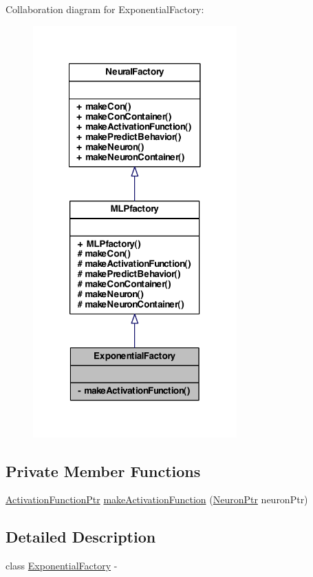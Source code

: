 Collaboration diagram for ExponentialFactory:
\nopagebreak
\begin{figure}[H]
\begin{center}
\leavevmode
\includegraphics[width=222pt]{class_exponential_factory__coll__graph}
\end{center}
\end{figure}
\subsection*{Private Member Functions}
\begin{DoxyCompactItemize}
\item 
\hyperlink{_a_m_o_r_e_8h_a77602a0277a02e5769c3df0adc669b17}{ActivationFunctionPtr} \hyperlink{class_exponential_factory_a68819f57ee476e87a2aa23827fc52578}{makeActivationFunction} (\hyperlink{_a_m_o_r_e_8h_ac1ea936c2c7728eb382278131652fef4}{NeuronPtr} neuronPtr)
\end{DoxyCompactItemize}


\subsection{Detailed Description}
class \hyperlink{class_exponential_factory}{ExponentialFactory} -\/ 

